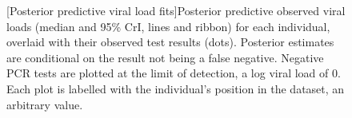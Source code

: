 \documentclass[thesis.tex]{subfiles}
\begin{document}
\begin{figure}
  \vspace{-3cm}
  \captionsetup{width=0.8\paperwidth}
  [Posterior predictive viral load fits]{Posterior predictive observed viral loads (median and 95\% CrI, lines and ribbon) for each individual, overlaid with their observed test results (dots). Posterior estimates are conditional on the result not being a false negative. Negative PCR tests are plotted at the limit of detection, \ie a log viral load of 0. Each plot is labelled with the individual's position in the dataset, an arbitrary value. \label{ATACCC:fig:goodness-of-fits}}
\end{figure}
\end{document}

